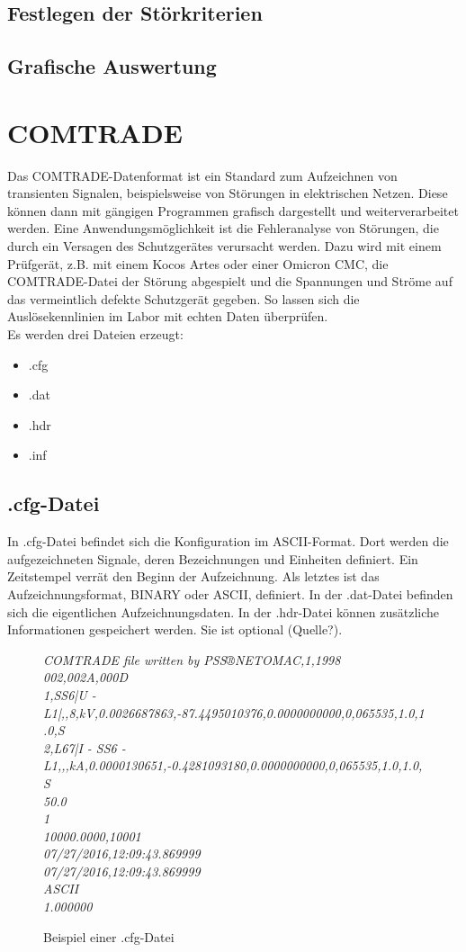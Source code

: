 \documentclass{scrartcl}
\begin{document}
\begin{onehalfspace}
\subsection{Festlegen der Störkriterien}
\subsection{Grafische Auswertung}


\section{COMTRADE}
Das COMTRADE-Datenformat ist ein Standard zum Aufzeichnen von transienten Signalen, beispielsweise von Störungen in elektrischen Netzen. Diese können dann mit gängigen Programmen grafisch dargestellt und weiterverarbeitet werden. Eine Anwendungsmöglichkeit ist die Fehleranalyse von Störungen, die durch ein Versagen des Schutzgerätes verursacht werden. Dazu wird mit einem Prüfgerät, z.B. mit einem Kocos Artes oder einer Omicron CMC, die COMTRADE-Datei der Störung \glqq abgespielt\grqq{} und die Spannungen und Ströme auf das vermeintlich defekte Schutzgerät gegeben. So lassen sich die Auslösekennlinien im Labor mit echten Daten überprüfen. \\ Es werden drei Dateien erzeugt:

\begin{itemize}
\item .cfg
\item .dat
\item .hdr
\item .inf
\end{itemize}

\subsection{.cfg-Datei}
In .cfg-Datei befindet sich die Konfiguration im ASCII-Format. Dort werden die aufgezeichneten Signale, deren Bezeichnungen und Einheiten definiert. Ein Zeitstempel verrät den Beginn der Aufzeichnung. Als letztes ist das Aufzeichnungsformat, BINARY oder ASCII, definiert. In der .dat-Datei befinden sich die eigentlichen Aufzeichnungsdaten. In der .hdr-Datei können zusätzliche Informationen gespeichert werden. Sie ist optional (Quelle?).

\begin{figure}[H]
\textit{COMTRADE file written by PSS®NETOMAC,1,1998 \\
002,002A,000D \\
1,SS6|U - L1|,,8,kV,0.0026687863,-87.4495010376,0.0000000000,0,065535,1.0,1.0,S \\
2,L67|I - SS6 - L1,,,kA,0.0000130651,-0.4281093180,0.0000000000,0,065535,1.0,1.0,S \\
50.0 \\
1 \\
10000.0000,10001 \\
07/27/2016,12:09:43.869999 \\
07/27/2016,12:09:43.869999 \\
ASCII \\
1.000000}
\caption{Beispiel einer .cfg-Datei}
\label{bsp-cfg}
\end{figure}


\end{onehalfspace}
\end{document}
